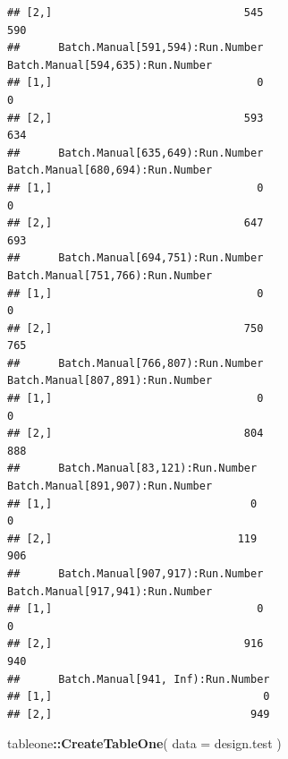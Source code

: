 \documentclass[]{article}
\newenvironment{Shaded}{\begin{snugshade}}{\end{snugshade}}
\newcommand{\DataTypeTok}[1]{\textcolor[rgb]{0.13,0.29,0.53}{#1}}
\newcommand{\KeywordTok}[1]{\textcolor[rgb]{0.13,0.29,0.53}{\textbf{#1}}}
\newcommand{\NormalTok}[1]{#1}
\newcommand{\OperatorTok}[1]{\textcolor[rgb]{0.81,0.36,0.00}{\textbf{#1}}}
\begin{document}
\begin{verbatim}
## [2,]                              545                              590
##      Batch.Manual[591,594):Run.Number Batch.Manual[594,635):Run.Number
## [1,]                                0                                0
## [2,]                              593                              634
##      Batch.Manual[635,649):Run.Number Batch.Manual[680,694):Run.Number
## [1,]                                0                                0
## [2,]                              647                              693
##      Batch.Manual[694,751):Run.Number Batch.Manual[751,766):Run.Number
## [1,]                                0                                0
## [2,]                              750                              765
##      Batch.Manual[766,807):Run.Number Batch.Manual[807,891):Run.Number
## [1,]                                0                                0
## [2,]                              804                              888
##      Batch.Manual[83,121):Run.Number Batch.Manual[891,907):Run.Number
## [1,]                               0                                0
## [2,]                             119                              906
##      Batch.Manual[907,917):Run.Number Batch.Manual[917,941):Run.Number
## [1,]                                0                                0
## [2,]                              916                              940
##      Batch.Manual[941, Inf):Run.Number
## [1,]                                 0
## [2,]                               949
\end{verbatim}

\begin{Shaded}
\begin{Highlighting}[]
\NormalTok{tableone}\OperatorTok{::}\KeywordTok{CreateTableOne}\NormalTok{( }\DataTypeTok{data =}\NormalTok{ design.test )}
\end{Highlighting}
\end{Shaded}
\end{document}
